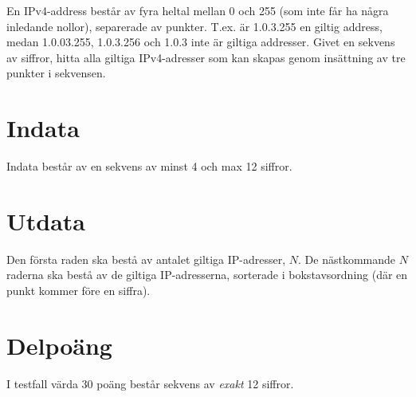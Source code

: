 En IPv4-address består av fyra heltal mellan 0 och 255 (som inte får ha några inledande nollor), separerade av punkter. T.ex. är 1.0.3.255 en giltig address, medan 1.0.03.255, 1.0.3.256 och 1.0.3 inte är giltiga addresser.
Givet en sekvens av siffror, hitta alla giltiga IPv4-adresser som kan skapas genom insättning av tre punkter i sekvensen.

\section*{Indata}
Indata består av en sekvens av minst 4 och max 12 siffror.

\section*{Utdata}
Den första raden ska bestå av antalet giltiga IP-adresser, $N$. De nästkommande $N$ raderna ska bestå av de giltiga IP-adresserna, sorterade i bokstavsordning (där en punkt kommer före en siffra).

\section*{Delpoäng}
I testfall värda 30 poäng består sekvens av \emph{exakt} 12 siffror.
